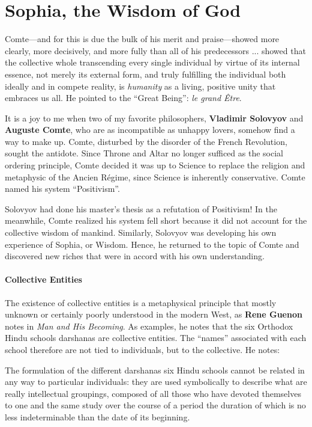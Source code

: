 \section{Sophia, the Wisdom of God}

\begin{quotex}
Comte---and for this is due the bulk of his merit and praise---showed more clearly, more decisively, and more fully than all of his predecessors ... showed that the collective whole transcending every single individual by virtue of its internal essence, not merely its external form, and truly fulfilling the individual both ideally and in compete reality, is \emph{humanity} as a living, positive unity that embraces us all. He pointed to the ``Great Being'': \emph{le grand Être}.
\end{quotex}


It is a joy to me when two of my favorite philosophers, \textbf{Vladimir Solovyov} and \textbf{Auguste Comte}, who are as incompatible as unhappy lovers, somehow find a way to make up. Comte, disturbed by the disorder of the French Revolution, sought the antidote. Since Throne and Altar no longer sufficed as the social ordering principle, Comte decided it was up to Science to replace the religion and metaphysic of the Ancien Régime, since Science is inherently conservative. Comte named his system ``Positivism''.

Solovyov had done his master's thesis as a refutation of Positivism! In the meanwhile, Comte realized his system fell short because it did not account for the collective wisdom of mankind. Similarly, Solovyov was developing his own experience of Sophia, or Wisdom. Hence, he returned to the topic of Comte and discovered new riches that were in accord with his own understanding.

\paragraph{Collective Entities}


The existence of collective entities is a metaphysical principle that mostly unknown or certainly poorly understood in the modern West, as \textbf{Rene Guenon} notes in \emph{Man and His Becoming}. As examples, he notes that the six Orthodox Hindu schools darshanas are collective entities. The ``names'' associated with each school therefore are not tied to individuals, but to the collective. He notes:

\begin{quotex}
The formulation of the different darshanas six Hindu schools cannot be related in any way to particular individuals: they are used symbolically to describe what are really intellectual groupings, composed of all those who have devoted themselves to one and the same study over the course of a period the duration of which is no less indeterminable than the date of its beginning.
\end{quotex}


